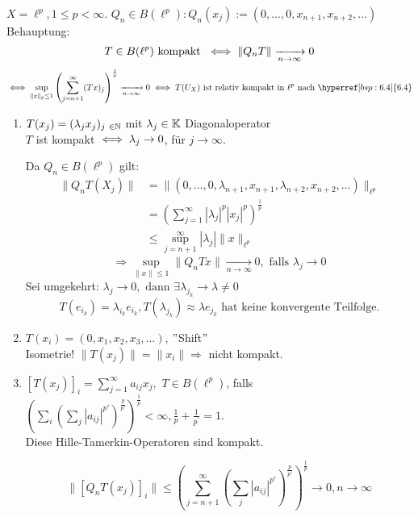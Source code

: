 \begin{beispiel} \label{bsp:7.2}
	$X = \ell^{p}, 1 \leq p < \infty.$ $Q_{n} \in B(\ell^{p}): Q_{n}(x_{j}) := (0, \dotsc, 0, x_{n + 1}, x_{n + 2}, \dotsc)$ \\
	Behauptung: 
	\[ T \in B(\ell^{p}) \text{ kompakt  } \iff \| Q_{n} T \| \xrightarrow[n \rightarrow \infty]{} 0 \]
	\[ \gdw \sup_{\|x\|_{p} \leq 1} \left( \sum_{j = n + 1}^{\infty} (Tx)_{j} \right)^{\frac{1}{p}} \xrightarrow[n \rightarrow \infty]{} 0 \gdw T(U_{X}) \text{ ist relativ kompakt in } \ell^{p} \text{ nach } \hyperref[bsp:6.4]{6.4} \]
	
	\begin{enumerate}[label=\alph*\upshape)]
		\item $T(x_{j}) = (\lambda_{j} x_{j})_{j \in \MdN}$ mit $\lambda_{j} \in \mathbb{K}$ Diagonaloperator \\
			$T$ ist kompakt $\iff \lambda_{j} \rightarrow 0$, für $j \rightarrow \infty$.
			\begin{beweis}
				Da $Q_{n} \in B(\ell^{p})$ gilt:
				\begin{align*}
					 \| Q_{n} T(X_{j}) \| & = \| (0, \dotsc, 0, \lambda_{n + 1}, x_{n + 1}, \lambda_{n + 2}, x_{n + 2}, \dotsc ) \|_{\ell^{p}} \\
										 & = \left( \sum_{j = 1}^{\infty} |\lambda_{j}|^{p} |x_{j}|^{p} \right)^{\frac{1}{p}} \\
										 & \leq 	\sup_{j = n + 1}^{\infty} |\lambda_{j}| \|x \|_{\ell^{p}}			
				\end{align*}
				\[ \Rightarrow \sup_{\| x \| \leq 1} \| Q_{n} T x \| \xrightarrow[n \rightarrow \infty]{} 0, \text{ falls } \lambda_{j} \rightarrow 0 \]
				Sei umgekehrt: $\lambda_{j} \rightarrow 0, \text{ dann } \exists \lambda_{j_{k}} \rightarrow \lambda \neq 0 $
				\[ T(e_{i_{k}}) = \lambda_{i_{k}} e_{i_{k}}, T(\lambda_{j_{k}}) \approx \lambda e_{j_{k}} \text{ hat keine konvergente Teilfolge.} \]
			\end{beweis}
		\item $T(x_{i})= (0, x_{1}, x_{2}, x_{3}, \dotsc)$, $"$Shift$"$ \\
			Isometrie! $\| T(x_{j}) \| = \| x_{i} \| \Rightarrow$ nicht kompakt.
		\item $\left[ T(x_{j}) \right]_{i} = \sum_{j = 1}^{\infty} a_{ij} x_{j},$ $T \in B(\ell^{p})$, falls $\left( \sum_{i} \left( \sum_{j} | a_{ij} |^{p'} \right)^{\frac{p}{p'}} \right)^{\frac{1}{p}} < \infty, \frac{1}{p} + \frac{1}{p^{'}} = 1. $\\
			Diese Hille-Tamerkin-Operatoren sind kompakt.
			\begin{beweis}
				\[ \| \left[ Q_{n} T(x_{j}) \right]_{i} \| \leq \left( \sum_{j = n + 1}^{\infty} \left( \sum_{j} |a_{ij}|^{p'} \right)^{\frac{p}{p'}} \right)^{\frac{1}{p}} \rightarrow 0, n \rightarrow \infty \]
			\end{beweis}

	\end{enumerate}
\end{beispiel}

